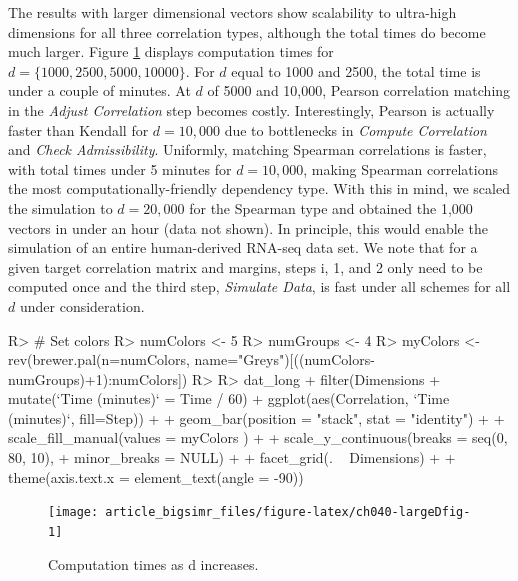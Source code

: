 \documentclass[
]{jss}
\begin{document}
\begin{CodeChunk}
\end{CodeChunk}

The results with larger dimensional vectors show scalability to ultra-high dimensions for all three correlation types, although the total times do become much larger.
Figure \ref{fig:ch040-largeDfig} displays computation times for \(d=\{1000, 2500, 5000, 10000\}\). For \(d\) equal to 1000 and 2500, the total time is under a couple of minutes. At \(d\) of 5000 and 10,000, Pearson correlation matching in the \emph{Adjust Correlation} step becomes costly. Interestingly, Pearson is actually faster than Kendall for \(d=10,000\) due to bottlenecks in \emph{Compute Correlation} and \emph{Check Admissibility}. Uniformly, matching Spearman correlations is faster, with total times under 5 minutes for \(d=10,000\), making Spearman correlations the most computationally-friendly dependency type. With this in mind, we scaled the simulation to \(d=20,000\) for the Spearman type and obtained the 1,000 vectors in under an hour (data not shown). In principle, this would enable the simulation of an entire human-derived RNA-seq data set. We note that for a given target correlation matrix and margins, steps i, 1, and 2 only need to be computed once and the third step, \emph{Simulate Data}, is fast under all schemes for all \(d\) under consideration.

\begin{CodeChunk}
\begin{CodeInput}
R> # Set colors
R> numColors <- 5
R> numGroups <- 4
R> myColors <- rev(brewer.pal(n=numColors, name="Greys")[((numColors-numGroups)+1):numColors])
R> 
R> dat_long %
+     filter(Dimensions %
+     mutate(`Time (minutes)` = Time / 60) %
+     ggplot(aes(Correlation, `Time (minutes)`, fill=Step)) +
+     geom_bar(position = "stack", stat = "identity") +
+     scale_fill_manual(values = myColors ) +
+     scale_y_continuous(breaks = seq(0, 80, 10),
+                      minor_breaks = NULL) +
+     facet_grid(. ~ Dimensions) +
+     theme(axis.text.x = element_text(angle = -90))
\end{CodeInput}
\begin{figure}

{\centering \texttt{[image: article\_bigsimr\_files/figure-latex/ch040-largeDfig-1]} 

}

\caption[Computation times as d increases]{Computation times as d increases.}\label{fig:ch040-largeDfig}
\end{figure}
\end{CodeChunk}
\end{document}

